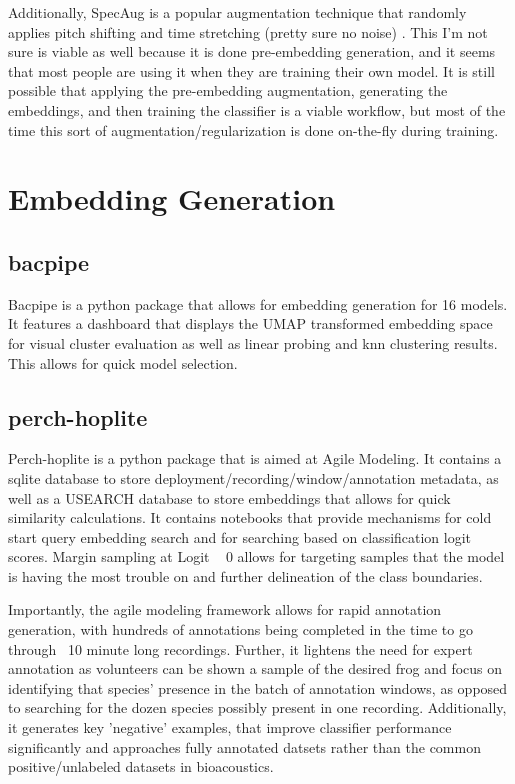 \documentclass{article}
\begin{document}
Additionally, SpecAug is a popular augmentation technique that randomly applies pitch shifting and time stretching (pretty sure no noise) \cite{parkSpecAugmentSimpleData2019}. This I'm not sure is viable as well because it is done pre-embedding generation, and it seems that most people are using it when they are training their own model. It is still possible that applying the pre-embedding augmentation, generating the embeddings, and then training the classifier is a viable workflow, but most of the time this sort of augmentation/regularization is done on-the-fly during training. 
\section{Embedding Generation}
\subsection{bacpipe}
Bacpipe is a python package that allows for embedding generation for 16 models. It features a dashboard that displays the UMAP transformed embedding space for visual cluster evaluation as well as linear probing and knn clustering results. This allows for quick model selection. 
\subsection{perch-hoplite}
Perch-hoplite is a python package that is aimed at Agile Modeling. It contains a sqlite database to store deployment/recording/window/annotation metadata, as well as a USEARCH database to store embeddings that allows for quick similarity calculations. It contains notebooks that provide mechanisms for cold start query embedding search and for searching based on classification logit scores. Margin sampling at Logit ~ 0 allows for targeting samples that the model is having the most trouble on and further delineation of the class boundaries. 

Importantly, the agile modeling framework allows for rapid annotation generation, with hundreds of annotations being completed in the time to go through ~10 minute long recordings. Further, it lightens the need for expert annotation as volunteers can be shown a sample of the desired frog and focus on identifying that species' presence in the batch of annotation windows, as opposed to searching for the dozen species possibly present in one recording. Additionally, it generates key 'negative' examples, that improve classifier performance significantly and approaches fully annotated datsets rather than the common positive/unlabeled datasets in bioacoustics. 
\end{document}
